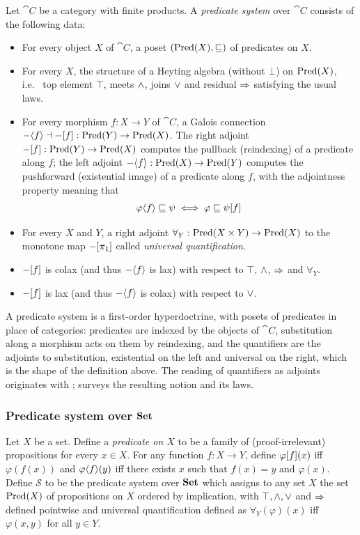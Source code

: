 Let $\cat{C}$ be a category with finite products. A \emph{predicate system} over $\cat{C}$ consists of the
following data:
\begin{itemize}
\item For every object $X$ of $\cat{C}$, a poset $(\mathrm{Pred}(X), \sqsubseteq)$ of predicates on $X$.
\item For every $X$, the structure of a Heyting algebra (without $\bot$) on $\mathrm{Pred}(X)$, i.e.~ top element
   $\top$, meets $\wedge$, joins $\vee$ and residual $\Rightarrow$ satisfying the usual laws.
\item For every morphism $f: X \to Y$ of $\cat{C}$, a Galois connection $-\langle f\rangle \dashv
-[f] : \mathrm{Pred}(Y) \to \mathrm{Pred}(X)$. The right adjoint $-[f]: \mathrm{Pred}(Y) \to \mathrm{Pred}(X)$ computes
the pullback (reindexing) of a predicate along $f$; the left adjoint $-\langle f\rangle: \mathrm{Pred}(X) \to
\mathrm{Pred}(Y)$ computes the pushforward (existential image) of a predicate along $f$, with the adjointness property
meaning that
\[\varphi\langle f\rangle \sqsubseteq \psi \iff \varphi \sqsubseteq \psi[f] \]
\item For every $X$ and $Y$, a right adjoint $\forall_Y: \mathrm{Pred}(X \times Y) \to \mathrm{Pred}(X)$ to the monotone map
$-[\pi_1]$ called \emph{universal quantification}.
\item $-[f]$ is colax (and thus $-\langle f\rangle$ is lax) with respect to $\top$, $\wedge$,
$\Rightarrow$ and $\forall_Y$.
\item $-[f]$ is lax (and thus $-\langle f\rangle$ is colax) with respect to $\vee$.
\end{itemize}

\noindent
A predicate system is a first-order hyperdoctrine, with posets of predicates in place of
categories: predicates are indexed by the objects of $\cat{C}$, substitution along a morphism acts
on them by reindexing, and the quantifiers are the adjoints to substitution, existential on the
left and universal on the right, which is the shape of the definition above. The reading of
quantifiers as adjoints originates with \citet{lawvere69}; \citet{pitts01} surveys the resulting
notion and its laws.

\subsubsection{Predicate system over $\mathbf{Set}$}

Let $X$ be a set. Define a \emph{predicate on $X$} to be a family of (proof-irrelevant) propositions for
every $x \in X$. For any function $f: X \to Y$, define $\varphi[f](x)$ iff $\varphi(f(x))$ and
$\varphi\langle f\rangle(y)$ iff there exists $x$ such that $f(x) = y$ and $\varphi(x)$. Define $\mathcal{S}$ to be the
predicate system over $\mathbf{Set}$ which assigns to any set $X$ the set $\mathrm{Pred}(X)$ of propositions on $X$ ordered by
implication, with $\top, \wedge, \vee$ and $\Rightarrow$ defined pointwise and universal quantification defined
as $\forall_Y(\varphi)(x)$ iff $\varphi(x,y)$ for all $y \in Y$.

